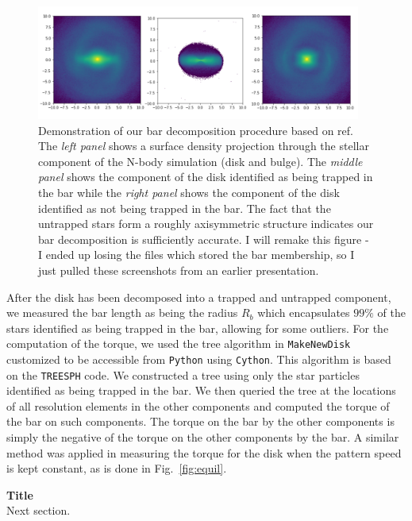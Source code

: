 \documentclass{natureprintstyle}
\begin{document}
\begin{figure}[h]%
\centering
\includegraphics[width=0.95\textwidth]{fig/fig-bar_decomp.pdf}
\caption{Demonstration of our bar decomposition procedure based on
ref.\cite{2016MNRAS.463.1952P} The \textit{left panel} shows a surface density
projection through the stellar component of the N-body simulation (disk and
bulge). The \textit{middle panel} shows the component of the disk identified
as being trapped in the bar while the \textit{right panel} shows the component
of the disk identified as not being trapped in the bar. The fact that the
untrapped stars form a roughly axisymmetric structure indicates our bar
decomposition is sufficiently accurate. {\color{red} I will remake this figure
- I ended up losing the files which stored the bar membership, so I just
pulled these screenshots from an earlier presentation.}}
\label{fig:decomp}
\end{figure}

After the disk has been decomposed into a trapped and untrapped component, we
measured the bar length as being the radius $R_b$ which encapsulates $99\%$ of
the stars identified as being trapped in the bar, allowing for some outliers.
For the computation of the torque, we used the tree algorithm in
\texttt{MakeNewDisk} customized to be accessible from \texttt{Python} using
\texttt{Cython}. This algorithm is based on the \texttt{TREESPH} code. We
constructed a tree using only the star particles identified as being trapped
in the bar. We then queried the tree at the locations of all resolution
elements in the other components and computed the torque of the bar on such
components. The torque on the bar by the other components is simply the
negative of the torque on the other components by the bar. A similar method
was applied in measuring the torque for the disk when the pattern speed is
kept constant, as is done in Fig.~\ref{fig:equil}.

\vspace{12pt}

\noindent
{\bf Title}
\\
\noindent
Next section.

% 
\end{document}
